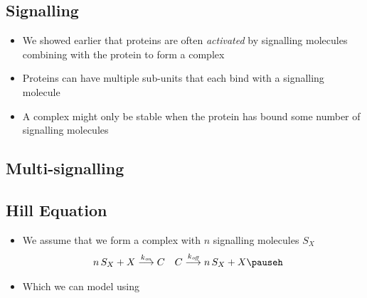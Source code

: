
\begin{slide}
\section{Signalling}

\begin{PauseHighLight}
  \begin{itemize}
  \item We showed earlier that proteins are often \textit{activated} by
    signalling molecules combining with the protein to form a
    complex\pause
  \item Proteins can have multiple sub-units that each bind with a
    signalling molecule\pause
  \item A complex might only be stable when the protein has bound some
    number of signalling molecules\pause
  \end{itemize}
\end{PauseHighLight}

\end{slide}


\begin{slide}
\section[-2]{Multi-signalling}

\pause\pb{}
\begin{center}
  \pause
\end{center}
\end{slide}

\newcommand{\koff}{k_{\text{\tiny\it off}}}
\newcommand{\kon}{k_{\text{\tiny\it on}}}

\begin{slide}
\section[-2]{Hill Equation}

\pb
\begin{itemize}
\item We assume that we form a complex with $n$ signalling molecules
  $S_X$
  \begin{align*}
    n\, S_X + X &\stackrel{\kon}{\longrightarrow} C
    &
      C &\stackrel{\koff}{\longrightarrow} n\, S_X + X \pauseh
  \end{align*}
\item Which we can model using
\end{itemize}
  \begin{center}
    \pause
  \end{center}

\end{slide}



